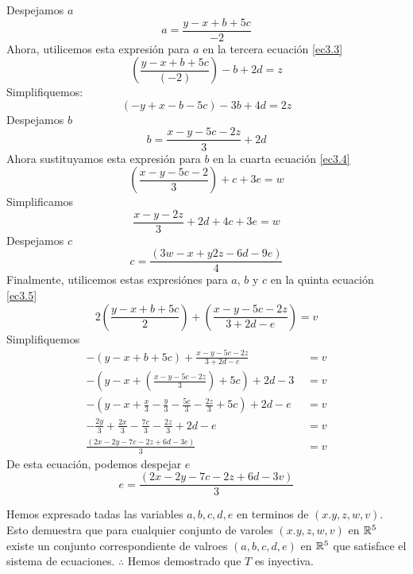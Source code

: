 \begin{enumerate}
      Despejamos $a$
      \begin{equation*}
            a = \frac{y-x+b+5c}{-2}
      \end{equation*}
      Ahora, utilicemos esta expresión para $a$ en la tercera ecuación \eqref{ec3.3}
      \begin{equation*}
            \left( \frac{y-x+b+5c}{(-2)}   \right)  - b + 2d = z
      \end{equation*}
      Simplifiquemos:
      \begin{equation*}
            (-y + x -b - 5c) -3b +4d = 2z
      \end{equation*}
      Despejamos $b$
      \begin{equation*}
            b = \frac{x-y-5c-2z}{3} + 2d
      \end{equation*}
      Ahora sustituyamos esta expresión para $b$ en la cuarta ecuación \eqref{ec3.4}
      \begin{equation*}
            \left( \frac{x - y - 5c  - 2}{3} \right) + c  + 3e = w
      \end{equation*}
      Simplificamos
      \begin{equation*}
            \frac{x-y-2z}{3} + 2d +4c +3e = w
      \end{equation*}
      Despejamos $c$ 
      \begin{equation*}
            c = \frac{(3w - x + y 2z - 6d -9e)}{4}
      \end{equation*}
      Finalmente, utilicemos estas expresiónes para $a$, $b$ y $c$ en la quinta ecuación \eqref{ec3.5}
      \begin{equation*}
            2 \left(\frac{y-x+b+5c}{2}\right) + \left(\frac{x-y-5c-2z}{3+2d-e}\right) = v
      \end{equation*}
      Simplifiquemos
      \begin{align*}
            -(y-x+b+5c) + \frac{x-y-5c -2z}{3 + 2d -e} & \,\, = v \\
            -\left(y-x+ (\frac{x-y-5c-2z}{3}) + 5c\right) + 2d -3 & \,\, = v  \\
            -\left(y-x+\frac{x}{3} - \frac{y}{3} - \frac{5c}{3} - \frac{2z}{3} + 5c\right) + 2d -e & \,\, = v \\
            -\frac{2y}{3} + \frac{2x}{3} -\frac{7c}{3} - \frac{2z}{3}  + 2d - e & \,\, = v \\
            \frac{(2x -2y -7c -2z +6d -3e)}{3} & \,\, = v
      \end{align*}
      De esta ecuación, podemos despejar $e$
      \begin{equation*}
            e = \frac{(2x - 2y -7c - 2z +6d -3v)}{3}
      \end{equation*}

      Hemos expresado tadas las variables $a,b,c,d,e$ en terminos de $(x.y,z,w,v)$. Esto demuestra que para cualquier 
      conjunto de varoles $(x.y,z,w,v)$ en $\mathbb{R}^{5}$ existe un conjunto correspondiente de valroes $(a,b,c,d,e)$ en $\mathbb{R}^{5}$
      que satisface el sistema de ecuaciones. $\therefore$ Hemos demostrado que $T$ es inyectiva.

\end{enumerate}
